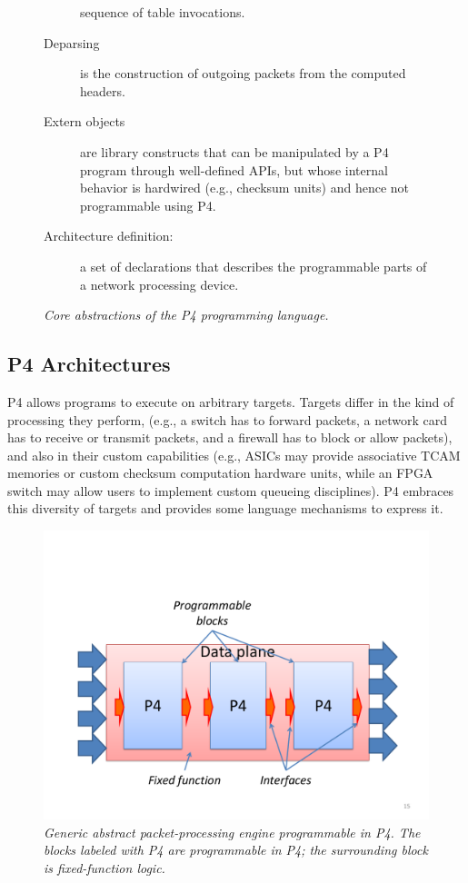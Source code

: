 \begin{figure}[h]
\begin{mdframed}[style=mdstyle]
\begin{description}
  sequence of table invocations.
\item[Deparsing] is the construction of outgoing packets from the
  computed headers.
\item[Extern objects] are library constructs that can be manipulated
  by a P4 program through well-defined APIs, but whose internal
  behavior is hardwired (e.g., checksum units) and hence not
  programmable using P4.
\item[Architecture definition:] a set of declarations that describes
  the programmable parts of a network processing device.
    \end{description}
  \end{mdframed}
  \caption{\sl Core abstractions of the P4 programming language.\label{fig:abstractions}}
\end{figure}

\subsection{P4 Architectures}

P4 allows programs to execute on arbitrary targets.  Targets differ in
the kind of processing they perform, (e.g., a switch has to forward
packets, a network card has to receive or transmit packets, and a
firewall has to block or allow packets), and also in their custom
capabilities (e.g., ASICs may provide associative TCAM memories or
custom checksum computation hardware units, while an FPGA switch may
allow users to implement custom queueing disciplines).  P4
embraces this diversity of targets and provides some language
mechanisms to express it.

\begin{figure}[h]
  \centerline{\includegraphics[width=.5\textwidth,clip,trim=1in 0.9in
      .8in 1.8in]{architecture.pdf}}
  \caption{\sl Generic abstract packet-processing engine programmable
    in P4.  The blocks labeled with P4 are programmable in P4; the
    surrounding block is fixed-function
    logic.\label{fig:architecture}}
\end{figure}

